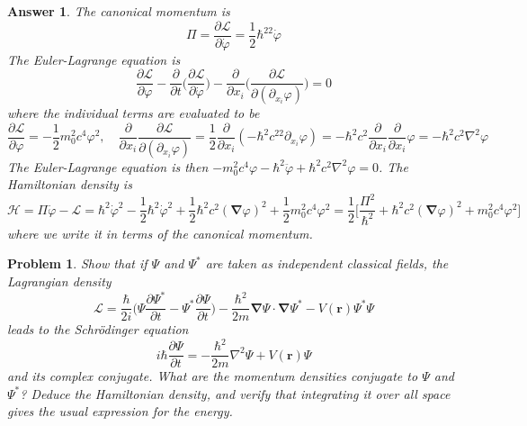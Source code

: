 \documentclass[a4paper]{article}
\newtheorem{ans}{Answer}[section]
\theoremstyle{new}
\newtheorem{qns}{Problem}[section]
\begin{document}
\begin{ans}
The canonical momentum is
$$\Pi=\frac{\partial\mathcal{L}}{\partial\dot{\varphi}}=\frac{1}{2}\hbar^22\dot{\varphi}$$
The Euler-Lagrange equation is
$$\frac{\partial\mathcal{L}}{\partial\varphi}-\frac{\partial}{\partial t}\bigg(\frac{\partial\mathcal{L}}{\partial\dot{\varphi}}\bigg)-\frac{\partial}{\partial x_i}\bigg(\frac{\partial\mathcal{L}}{\partial(\partial_{x_i}\varphi)}\bigg)=0$$
where the individual terms are evaluated to be
$$\frac{\partial\mathcal{L}}{\partial\varphi}=-\frac{1}{2}m_0^2c^4\varphi^2,\quad\frac{\partial}{\partial x_i}\frac{\partial\mathcal{L}}{\partial(\partial_{x_i}\varphi)}=\frac{1}{2}\frac{\partial}{\partial x_i}(-\hbar^2c^22\partial_{x_i}\varphi)=-\hbar^2c^2\frac{\partial}{\partial x_i}\frac{\partial}{\partial x_i}\varphi=-\hbar^2c^2\nabla^2\varphi$$
The Euler-Lagrange equation is then $-m_0^2c^4\varphi-\hbar^2\ddot{\varphi}+\hbar^2c^2\nabla^2\varphi=0$. The Hamiltonian density is
$$\mathcal{H}=\Pi\dot{\varphi}-\mathcal{L}=\hbar^2\dot{\varphi}^2-\frac{1}{2}\hbar^2\dot{\varphi}^2+\frac{1}{2}\hbar^2c^2(\boldsymbol{\nabla}\varphi)^2+\frac{1}{2}m_0^2c^4\varphi^2=\frac{1}{2}\bigg[\frac{\Pi^2}{\hbar^2}+\hbar^2c^2(\boldsymbol{\nabla}\varphi)^2+m_0^2c^4\varphi^2\bigg]$$
where we write it in terms of the canonical momentum.
\end{ans}
\newpage
\begin{qns}
Show that if $\Psi$ and $\Psi^*$ are taken as independent classical fields, the Lagrangian density
$$\mathcal{L}=\frac{\hbar}{2i}\bigg(\Psi\frac{\partial\Psi^*}{\partial t}-\Psi^*\frac{\partial\Psi}{\partial t}\bigg)-\frac{\hbar^2}{2m}\boldsymbol{\nabla}\Psi\cdot\boldsymbol{\nabla}\Psi^*-V(\mathbf{r})\Psi^*\Psi$$
leads to the Schr\"{o}dinger equation
$$i\hbar\frac{\partial\Psi}{\partial t}=-\frac{\hbar^2}{2m}\nabla^2\Psi+V(\mathbf{r})\Psi$$
and its complex conjugate. What are the momentum densities conjugate to $\Psi$ and $\Psi^*$? Deduce the Hamiltonian density, and verify that integrating it over all space gives the usual expression for the energy.
\end{qns}
\end{document}
